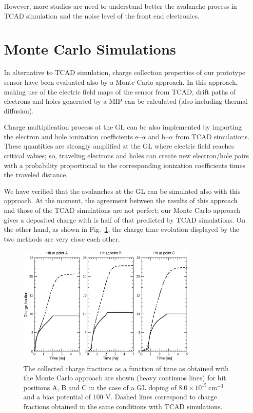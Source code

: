 \documentclass[aps,pt14,superscriptaddress,floatfix,nofootinbib]{revtex4}
\begin{document}
However, more studies are need to understand better the avalanche process in TCAD simulation and the noise 
level of the front end electronics.   

\section{Monte Carlo Simulations}
\label{sec:sim}

In alternative to TCAD simulation, charge collection properties of our prototype sensor have been evaluated also by a Monte Carlo approach. In this approach, making use of the electric field maps of the sensor from TCAD, drift paths of electrons and holes generated by a MIP can be calculated (also including thermal diffusion). 

Charge multiplication process at the GL can be also implemented by importing the electron and hole ionization coefficients e--$\alpha$ and h--$\alpha$ from TCAD simulations. These quantities are strongly amplified at the GL where electric field reaches critical values; so, traveling electrons and holes can create new electron/hole pairs with a probability proportional to the corresponding ionization coefficients times the traveled distance.    

We have verified that the avalanches at the GL can be simulated also with this approach. At the moment, the agreement between the results of this approach and those of the TCAD simulations are not perfect; our Monte Carlo approach gives a deposited charge with is half of that predicted by TCAD simulations. On the other hand, as shown in Fig.~\ref{fig:NewChargeFraction}, the charge time evolution displayed by the two methods are very close each other. 

\begin{figure}[hbtp]
\begin{center}
\includegraphics[width=0.8\textwidth,keepaspectratio]{figures1/NewChargeFraction.pdf}
\caption{The collected charge fractions as a function of time as obtained with the Monte Carlo approach are shown (heavy continuos lines) for hit positions A, B and C in the case of a GL doping of $8.0\times 10^{15}\ \mathrm{cm^{-3}}$ and a bias potential of 100 V. Dashed lines correspond to charge fractions obtained in the same conditions with TCAD simulations.\label{fig:NewChargeFraction}}
\end{center}
\end{figure}
\end{document}
